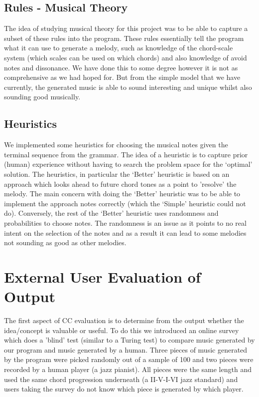 \documentclass[pdftex,12pt,a4paper]{report}
\begin{document}
\subsection{Rules - Musical Theory}
The idea of studying musical theory for this project was to be able to capture a subset of these rules into the program. These rules essentially tell the program what it can use to generate a melody, such as knowledge of the chord-scale system (which scales can be used on which chords) and also knowledge of avoid notes and dissonance. We have done this to some degree however it is not as comprehensive as we had hoped for. But from the simple model that we have currently, the generated music is able to sound interesting and unique whilst also sounding good musically.

\subsection{Heuristics}
We implemented some heuristics for choosing the musical notes given the terminal sequence from the grammar. The idea of a heuristic is to capture prior (human) experience without having to search the problem space for the `optimal' solution. The heuristics, in particular the `Better' heuristic is based on an approach which looks ahead to future chord tones as a point to 'resolve' the melody. The main concern with doing the `Better' heuristic was to be able to implement the approach notes correctly (which the `Simple' heuristic could not do). Conversely, the rest of the `Better' heuristic uses randomness and probabilities to choose notes. The randomness is an issue as it points to no real intent on the selection of the notes and as a result it can lead to some melodies not sounding as good as other melodies.

\section{External User Evaluation of Output}
The first aspect of CC evaluation is to determine from the output whether the idea/concept is valuable or useful. To do this we introduced an online survey which does a 'blind' test (similar to a Turing test) to compare music generated by our program and music generated by a human. Three pieces of music generated by the program were picked randomly out of a sample of 100 and two pieces were recorded by a human player (a jazz pianist). All pieces were the same length and used the same chord progression underneath (a II-V-I-VI jazz standard) and users taking the survey do not know which piece is generated by which player.
\end{document}
